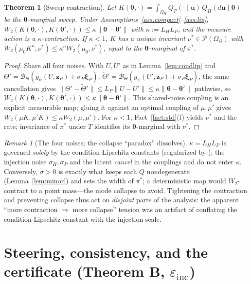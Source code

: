 \documentclass[11pt]{article}
\theoremstyle{plain}
\newtheorem{theorem}{Theorem}
\theoremstyle{definition}
\theoremstyle{remark}
\newtheorem{remark}{Remark}
\newcommand{\cP}{\mathcal{P}}
\newcommand{\Om}{\Omega}
\newcommand{\bth}{\bm{\theta}}
\newcommand{\bu}{\bm{u}}
\newcommand{\norm}[1]{\lVert #1 \rVert}
\newcommand{\einc}{\varepsilon_{\mathrm{inc}}}
\begin{document}
\begin{theorem}[Sweep contraction]
\label{thm:rate}
Let $K(\bth,\cdot)=\int_{\Om_H}Q_P(\cdot\mid\bu)\,Q_H(d\bu\mid\bth)$ be the $\bth$-marginal sweep. Under
Assumptions~\ref{ass:compact}--\ref{ass:lip},
$W_2(K(\bth,\cdot),K(\bth',\cdot))\le\kappa\norm{\bth-\bth'}$ with $\kappa:=L_HL_P$, and the measure
action is a $\kappa$-contraction. If $\kappa<1$, $K$ has a unique invariant $\nu^\ast\in\cP(\Om_\Theta)$
with $W_2(\mu_0K^n,\nu^\ast)\le\kappa^n W_2(\mu_0,\nu^\ast)$, equal to the $\bth$-marginal of $\pi^\ast$.
\end{theorem}
\begin{proof}
Share all four noises. With $U,U'$ as in Lemma~\ref{lem:condlip} and
$\Theta'=\mathcal B_\Theta(g_\psi(U,\bm z_P)+\sigma_P\bm\xi_P)$,
$\tilde\Theta'=\mathcal B_\Theta(g_\psi(U',\bm z_P)+\sigma_P\bm\xi_P)$, the same cancellation gives
$\norm{\Theta'-\tilde\Theta'}\le L_P\norm{U-U'}\le\kappa\norm{\bth-\bth'}$ pathwise, so
$W_2(K(\bth,\cdot),K(\bth',\cdot))\le\kappa\norm{\bth-\bth'}$. This shared-noise coupling is an explicit
measurable map; gluing it against an optimal coupling of $\mu,\mu'$ gives
$W_2(\mu K,\mu'K)\le\kappa W_2(\mu,\mu')$. For $\kappa<1$, Fact~\ref{fact:std}(f) yields $\nu^\ast$ and
the rate; invariance of $\pi^\ast$ under $T$ identifies its $\bth$-marginal with $\nu^\ast$.
\end{proof}

\begin{remark}[The four noises; the collapse ``paradox'' dissolves]
\label{rem:noises}
$\kappa=L_HL_P$ is governed \emph{solely} by the condition-Lipschitz constants (regularized by
\citealp{bishop1995}); the injection noise $\sigma_H,\sigma_P$ and the latent \emph{cancel} in the
couplings and do not enter $\kappa$. Conversely, $\sigma>0$ is exactly what keeps each $Q$
nondegenerate (Lemma~\ref{lem:minor}) and sets the width of $\pi^\ast$; a deterministic map would
$W_2$-contract to a point mass---the mode collapse to avoid. Tightening the contraction and preventing
collapse thus act on \emph{disjoint} parts of the analysis: the apparent ``more contraction
$\Rightarrow$ more collapse'' tension was an artifact of conflating the condition-Lipschitz constant
with the injection scale.
\end{remark}

\section{Steering, consistency, and the certificate (Theorem B, $\einc$)}
\label{sec:steering}
\end{document}

